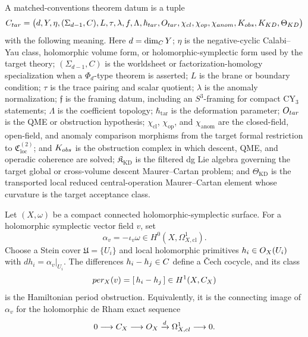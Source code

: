 \begin{defn}\label{defn:matched-conventions-theorem-datum}
  A matched-conventions theorem datum is a tuple
  \[
  C_{tar}=
  \bigl(
    d,Y,\eta,(\Sigma_{d-1},C),L,\tau,\lambda,f,\Lambda,
    \hbar_{tar},O_{tar},
    \chi_{cl},\chi_{op},\chi_{anom},
    K_{obs},K_{KD},\Theta_{KD}
  \bigr)
  \]
  with the following meaning.  Here \(d=\dim_{C} Y\);
  \(\eta\) is the negative-cyclic Calabi--Yau class, holomorphic volume
  form, or holomorphic-symplectic form used by the target theory;
  \((\Sigma_{d-1},C)\) is the worldsheet or factorization-homology
  specialization when a \(\Phi_d\)-type theorem is asserted; \(L\) is the
  brane or boundary condition; \(\tau\) is the trace pairing and scalar
  quotient; \(\lambda\) is the anomaly normalization; \(\mathfrak f\) is the
  framing datum, including an \(S^3\)-framing for compact CY\(_3\)
  statements; \(\Lambda\) is the coefficient topology; \(\hbar_{\mathrm{tar}}\)
  is the deformation parameter; \(O_{tar}\) is the QME or
  obstruction hypothesis; \(\chi_{\mathrm{cl}}\), \(\chi_{\mathrm{op}}\),
  and \(\chi_{\mathrm{anom}}\) are the closed-field, open-field, and anomaly
  comparison morphisms from the target formal restriction to
  \(\mathfrak C_{\mathrm{loc}}^{(2)}\); and
  \(K_{obs}\) is the obstruction complex in which descent,
  QME, and operadic coherence are solved;
  \(\mathfrak K_{\mathrm{KD}}\) is the filtered dg Lie algebra governing
  the target global or cross-volume descent Maurer--Cartan problem; and
  \(\Theta_{\mathrm{KD}}\) is the transported local reduced
  central-operation Maurer--Cartan element whose curvature is the target
  acceptance class.
\end{defn}

\begin{defn}\label{defn:compact-hamiltonian-period-complex}
  Let \((X,\omega)\) be a compact connected holomorphic-symplectic
  surface.  For a holomorphic symplectic vector field \(v\), set
  \[
    \alpha_v=-\iota_v\omega\in H^0(X,\Omega^1_{X,\mathrm{cl}}).
  \]
  Choose a Stein cover \(\mathfrak U=\{U_i\}\) and local holomorphic
  primitives \(h_i\in O_X(U_i)\) with \(dh_i=\alpha_v|_{U_i}\).
  The differences \(h_i-h_j\in C\) define a \v{C}ech cocycle, and its class
  \[
    per_X(v)=
    [\,h_i-h_j\,]\in H^1(X,C_X)
  \]
  is the Hamiltonian period obstruction.  Equivalently, it is the
  connecting image of \(\alpha_v\) for the holomorphic de Rham exact
  sequence
  \[
    0\longrightarrow C_X\longrightarrow O_X
      \xrightarrow{d}\Omega^1_{X,cl}\longrightarrow0.
  \]
\end{defn}

